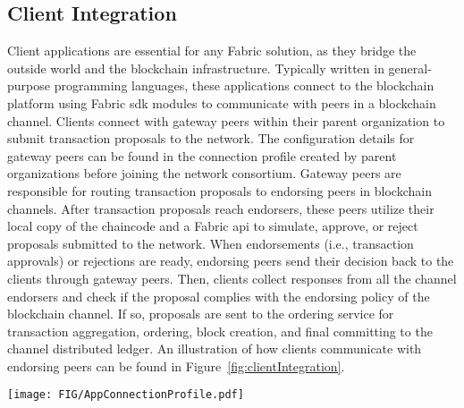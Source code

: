 \documentclass[conference]{IEEEtran}
\begin{document}
\subsection{Client Integration}
Client applications are essential for any Fabric solution, as they bridge the outside world and the blockchain infrastructure. Typically written in general-purpose programming languages, these applications connect to the blockchain platform using Fabric \ac{sdk} modules to communicate with peers in a blockchain channel. Clients connect with gateway peers within their parent organization to submit transaction proposals to the network. The configuration details for gateway peers can be found in the connection profile created by parent organizations before joining the network consortium. Gateway peers are responsible for routing transaction proposals to endorsing peers in blockchain channels. After transaction proposals reach endorsers, these peers utilize their local copy of the chaincode and a Fabric \ac{api} to simulate, approve, or reject proposals submitted to the network. When endorsements (i.e., transaction approvals) or rejections are ready, endorsing peers send their decision back to the clients through gateway peers. Then, clients collect responses from all the channel endorsers and check if the proposal complies with the endorsing policy of the blockchain channel. If so, proposals are sent to the ordering service for transaction aggregation, ordering, block creation, and final committing to the channel distributed ledger. An illustration of how clients communicate with endorsing peers can be found in Figure~\ref{fig:clientIntegration}.
%
\begin{figure*}
    \centering
    \texttt{[image: FIG/AppConnectionProfile.pdf]}
    \caption{Communication between client applications and channel endorsers through gateway peers.}
    \label{fig:clientIntegration}
\end{figure*}
%
\end{document}
